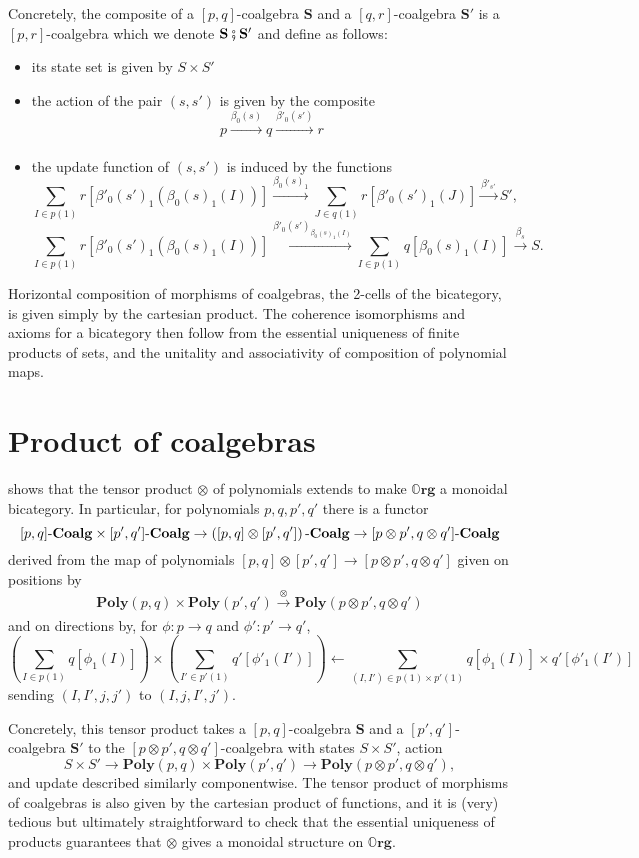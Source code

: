 \documentclass[11pt, one side, article]{memoir}
\theoremstyle{definition}
\theoremstyle{plain}
\newcommand{\Cat}[1]{\mathbf{#1}}%
\newcommand{\then}{\mathbin{\fatsemi}}
\newcommand{\To}[2][]{\xrightarrow[#1]{#2}}
\newcommand{\from}{\leftarrow}
\newcommand{\tn}[1]{\textnormal{#1}}
\newcommand{\poly}{\Cat{Poly}}
\newcommand{\0}{\textsf{0}}
\newcommand{\1}{\tn{\textsf{1}}}
\newcommand{\coalg}{\tn{-}\Cat{Coalg}}
\newcommand{\org}{{\mathbb{O}\Cat{rg}}}
\renewcommand{\S}{{\Cat{S}}}
\begin{document}
Concretely, the composite of a $[p,q]$-coalgebra $\S$ and a $[q,r]$-coalgebra $\S'$ is a $[p,r]$-coalgebra which we denote $\S\then\S'$  and define as follows:
\begin{itemize}
	\item its state set is given by $S \times S'$
	\item the action of the pair $(s,s')$ is given by the composite 
$$p \To{\beta_0(s)} q \To{\beta'_0(s')} r$$
	\item the update function of $(s,s')$ is induced by the functions
$$\sum_{I \in p(1)} r[\beta'_0(s')_1(\beta_0(s)_1(I))] \To{\beta_0(s)_1} \sum_{J \in q(1)} r[\beta'_0(s')_1(J)] \To{\beta'_{s'}} S',$$
$$\sum_{I \in p(1)} r[\beta'_0(s')_1(\beta_0(s)_1(I))] \To{\beta'_0(s')_{\beta_0(s)_1(I)}} \sum_{I \in p(1)} q[\beta_0(s)_1(I)] \To{\beta_s} S.$$%
\end{itemize}
Horizontal composition of morphisms of coalgebras, the 2-cells of the bicategory, is given simply by the cartesian product. The coherence isomorphisms and axioms for a bicategory then follow from the essential uniqueness of finite products of sets, and the unitality and associativity of composition of polynomial maps.%



\section{Product of coalgebras}


\cite[Proposition 2.13]{spivak2021learners} shows that the tensor product $\otimes$ of polynomials extends to make $\org$ a monoidal bicategory. In particular, for polynomials $p,q,p',q'$ there is a functor
$$[p,q]\coalg \times [p',q']\coalg \to \left([p,q] \otimes [p',q']\right)\coalg \to [p \otimes p',q \otimes q']\coalg$$
derived from the map of polynomials $[p,q] \otimes [p',q'] \to [p \otimes p',q \otimes q']$ given on positions by 
$$\poly(p,q) \times \poly(p',q') \To{\otimes} \poly(p \otimes p',q \otimes q')$$
and on directions by, for $\phi : p \to q$ and $\phi' : p' \to q'$,
$$\left(\sum_{I \in p(1)} q[\phi_1(I)]\right) \times \left(\sum_{I' \in p'(1)} q'[\phi'_1(I')]\right) \from \sum_{(I,I') \in p(1) \times p'(1)} q[\phi_1(I)] \times q'[\phi'_1(I')]$$
sending $(I,I',j,j')$ to $(I,j,I',j')$.

Concretely, this tensor product takes a $[p,q]$-coalgebra $\S$ and a $[p',q']$-coalgebra $\S'$ to the $[p \otimes p',q \otimes q']$-coalgebra with states $S \times S'$, action
$$S \times S' \to \poly(p,q) \times \poly(p',q') \to \poly(p \otimes p',q \otimes q'),$$
and update described similarly componentwise. The tensor product of morphisms of coalgebras is also given by the cartesian product of functions, and it is (very) tedious but ultimately straightforward to check that the essential uniqueness of products guarantees that $\otimes$ gives a monoidal structure on $\org$.
\end{document}
